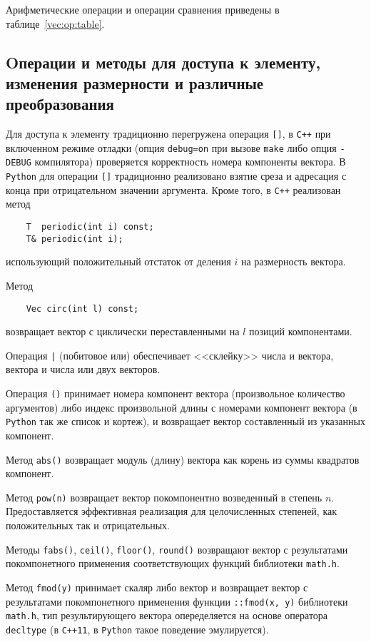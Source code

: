 Арифметические операции и операции сравнения приведены в таблице~\ref{vec:op:table}.

\subsection{Oперации и методы для доступа к элементу, изменения размерности и различные преобразования}
Для доступа к элементу традиционно перегружена операция {\tt []},
в {\tt C++} при включенном режиме отладки (опция \verb'debug=on' при вызове \verb'make' либо опция \verb'-DEBUG' компилятора) 
проверяется корректность номера компоненты вектора. 
В {\tt Python} для операции {\tt []} традиционно 
реализовано взятие среза и адресация с конца при отрицательном значении аргумента. Кроме того, в {\tt C++} реализован метод
\begin{verbatim}
    T  periodic(int i) const;
    T& periodic(int i);
\end{verbatim}
использующий положительный отстаток от деления $i$ на размерность вектора. 

Метод
\begin{verbatim}
    Vec circ(int l) const;
\end{verbatim}
возвращает вектор с циклически переставленными на $l$ позиций компонентами.

Операция \verb'|' (побитовое или) обеспечивает <<склейку>> числа и вектора, вектора и числа или двух векторов.

Операция \verb'()' принимает номера компонент вектора (произвольное количество аргументов) либо индекс произвольной 
длины с номерами компонент вектора (в {\tt Python} так же список и кортеж), и возвращает вектор составленный из
указанных компонент.

Метод \verb'abs()' возвращает модуль (длину) вектора как корень из суммы квадратов компонент. 

Метод \verb'pow(n)' возвращает вектор покомпонентно возведенный в степень $n$. Предоставляется эффективная 
реализация для целочисленных степеней, как положительных так и отрицательных.

Методы \verb'fabs()', \verb'ceil()', \verb'floor()', \verb'round()' возвращают вектор
с результатами покомпонетного применения соответствующих функций библиотеки {\tt math.h}. 

Метод \verb'fmod(y)' принимает скаляр либо вектор и возвращает вектор с результатами покомпонетного применения 
функции \verb'::fmod(x, y)' библиотеки {\tt math.h}, тип результирующего вектора опеределяется на основе оператора
\verb'decltype' (в {\tt C++11}, в {\tt Python} такое поведение эмулируется). 

